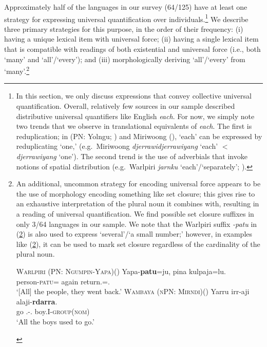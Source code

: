 \documentclass[12pt,egregdoesnotlikesansseriftitles]{scrartcl}
\newcommand{\ofy}{/125} %
\begin{document}
Approximately half of the languages in our survey (64\ofy) have at least one strategy for expressing universal quantification over individuals.\footnote{In this section, we only discuss expressions that convey collective universal quantification. Overall, relatively few sources in our sample described distributive universal quantifiers like English \textit{each}. For now, we simply note two trends that we observe in translational equivalents of \textit{each}. The first is reduplication; in {} (PN: Yolngu; \citealt[469]{wilkinson91}) and Miriwoong (\citealt[43]{kofod78}), `each' can be expressed by reduplicating `one,' (e.g.\ Miriwoong \textit{djerrawidjerrawiyang} `each' $<$ \textit{djerrawiyang} `one'). The second trend is the use of  adverbials that invoke notions of spatial distribution  (e.g.\ Warlpiri \textit{jarnku} `each'/`separately'; \citealt{bowler17}). }  We describe three primary strategies for this purpose, in the order of their frequency: (i) having a unique lexical item with universal force; (ii) having a single lexical item that is compatible with readings of both existential and universal force (i.e., both `many' and `all'/`every'); and (iii)  morphologically deriving `all'/`every' from `many'.\footnote{An additional, uncommon strategy for encoding universal force appears to be the use of morphology encoding something like set closure; this gives rise to an exhaustive interpretation of the plural noun it combines with, resulting in a reading of universal quantification. We find possible set closure suffixes in only 3/64 languages in our sample. We note that the Warlpiri suffix \textit{-patu} in (\ref{patuex1}) is also used to express `several'/`a small number;' however, in examples like (\ref{patuex1}), it can be used to mark set closure regardless of the cardinality of the plural noun.

\begin{exe}
  \ex \textsc{Warlpiri (PN: Ngumpin-Yapa)}\hfill (\citealt[13--14]{bowler17})
  \gll Yapa-\textbf{patu}=ju, pina kulpaja=lu.\\
  person-\textsc{patu}=\Top{} again return.\Pst=\Tpl.\Sarg\\
  \glt `[All] the people, they went back.'  \label{patuex1}
  \ex \textsc{Wambaya (nPN: Mirndi)}\hfill (\citealt[80]{nordlinger98})
  \gll Yarru irr-aji  alaji-\textbf{rdarra}.\\
  go \Tpl.\Sarg-\Hab.\Pst{} boy.I-\textsc{group(nom)}\\
  \glt `All the boys used to go.' 
\end{exe}}
\end{document}
